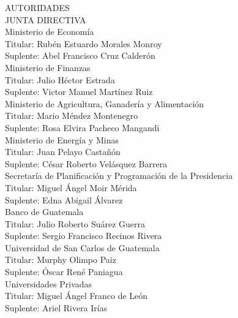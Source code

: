 \begin{center}
{\Bold \LARGE AUTORIDADES}\\[1cm]


{\Bold \large \color{color1!89!black} JUNTA  DIRECTIVA} \\[0.4cm]


{\Bold Ministerio de Economía}\\
Titular: Rubén Estuardo Morales Monroy\\
Suplente: Abel Francisco Cruz Calderón\\[0.4cm]


{\Bold Ministerio de Finanzas}\\
Titular: Julio Héctor Estrada\\
Suplente: Victor Manuel Martínez Ruiz\\[0.4cm]


{\Bold Ministerio de Agricultura, Ganadería y Alimentación}\\
Titular: Mario Méndez Montenegro\\
Suplente:  Rosa Elvira Pacheco Mangandi\\[0.4cm]


{\Bold Ministerio de Energía y Minas}\\
Titular: Juan Pelayo Castañón\\
Suplente: César Roberto Velásquez Barrera\\[0.4cm]


{\Bold Secretaría de Planificación y Programación de la Presidencia}\\
Titular: Miguel Ángel Moir Mérida\\
Suplente: Edna Abigail Álvarez\\[0.4cm]


{\Bold Banco de Guatemala}\\
Titular: Julio Roberto Suárez Guerra\\
Suplente: Sergio Francisco Recinos Rivera\\[0.4cm]



{\Bold Universidad de San Carlos de Guatemala}\\
Titular: Murphy Olimpo Paiz\\
Suplente:  Óscar René Paniagua \\[0.4cm]


{\Bold Universidades Privadas}\\
Titular: Miguel Ángel Franco de León\\
Suplente: Ariel Rivera Irías\\[0.4cm]



\end{center}
